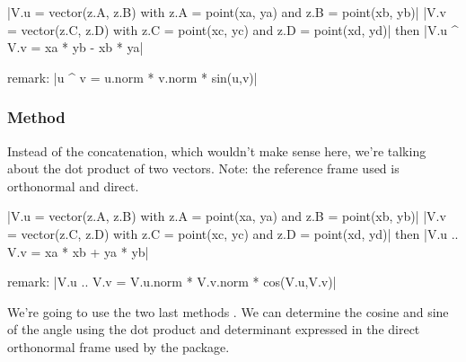 \begin{mybox}
|V.u = vector(z.A, z.B) with z.A = point(xa, ya) and z.B = point(xb, yb)|
|V.v = vector(z.C, z.D) with z.C = point(xc, yc) and z.D = point(xd, yd)|
then |V.u ^ V.v = xa * yb -  xb * ya|
\end{mybox}

remark: |u ^ v = u.norm * v.norm * sin(u,v)|

\subsubsection{Method }
\label{ssub:method_vector_dot}
Instead of the concatenation, which wouldn't make sense here, we're talking about the dot product of two vectors. Note: the reference frame used is orthonormal and direct.

\begin{mybox}
|V.u = vector(z.A, z.B) with z.A = point(xa, ya) and z.B = point(xb, yb)|
|V.v = vector(z.C, z.D) with z.C = point(xc, yc) and z.D = point(xd, yd)|
then |V.u .. V.v = xa * xb +  ya * yb|
\end{mybox}

remark: |V.u .. V.v = V.u.norm * V.v.norm * cos(V.u,V.v)|


We're going to use the two last methods . We can determine the cosine and sine of the angle using the dot product and determinant expressed in the direct orthonormal frame used by the package.

\begin{minipage}{.5\textwidth}
\end{minipage}
\begin{minipage}{.5\textwidth}
\begin{tkzexample}
\end{tkzexample}
\end{minipage}

